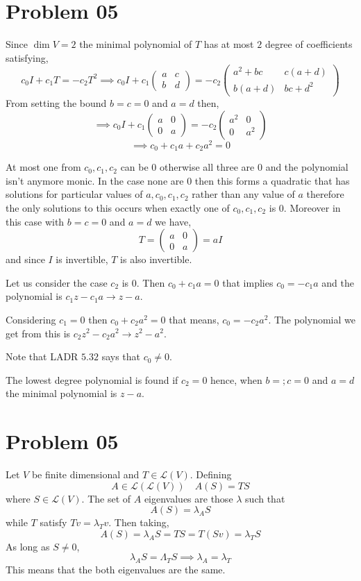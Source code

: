 \documentclass[letter]{article}
\begin{document}
	\section*{Problem 05} 
	Since $\dim V = 2$ the minimal polynomial of $T$ has at most $2$ degree of coefficients satisfying, 
	\[
	c_0 I + c_1 T = - c_2 T^2 \implies c_0 I + c_1 
	\begin{pmatrix} a & c \\ b & d \end{pmatrix}  = -c_2 
	\begin{pmatrix} a^2+ bc & c(a+d) \\ b(a+d) & bc + d^2 \end{pmatrix} 
	\] 
	From setting the bound $b=c=0$ and $a=d$ then, 
	\[
	\implies
	c_0 I + c_1 \begin{pmatrix} a & 0 \\ 0 & a \end{pmatrix} = 
	-c_2 \begin{pmatrix} a^2 & 0 \\ 0 & a^2 \end{pmatrix}  
	\]
	\[
	\implies c_0 + c_1 a + c_2 a^2 = 0
	\]

	At most one from  $c_0, c_1 ,c_2$ can be 0 otherwise all three are 0 and the polynomial isn't anymore monic. In the case none are $0$ then this forms a quadratic that has solutions for particular values of $a,c_0, c_1, c_2$ rather than any value of $a$ therefore the only solutions to this occurs when exactly one of $c_0,c_1,c_2$ is 0. Moreover in this case with $b = c = 0$ and $a = d$ we have, 
	\[
		T = \begin{pmatrix} a & 0 \\ 0 & a \end{pmatrix} = a I
	\] 
	and since $I$ is invertible, $T$ is also invertible. 

	Let us consider the case  $c_2$ is 0. Then $c_0 + c_1 a = 0$ that implies $c_0 = -c_1 a$ and the polynomial is $c_1 z - c_1 a \to  z - a$. 

	Considering $c_1 = 0$ then $c_0 + c_2 a^2 = 0$ that means, $c_0 = - c_2 a^2 $. The polynomial we get from this is $c_2 z^2 - c_2 a^2 \to z^2 - a^2$. 

	Note that LADR  $5.32$ says that $c_0 \neq 0$. 

	The lowest degree polynomial is found if $c_2 = 0$ hence, 
	when $b = ;c = 0$ and $a= d$ the minimal polynomial is $z- a$. 



\section{Problem 05} 
Let $V$ be finite dimensional and $T \in \mathcal L (V)$. Defining 
\[
A \in \mathcal L (\mathcal L (V)) \quad A(S) = TS 
\]
where $S \in \mathcal L (V)$. The set of $A$ eigenvalues are those $\lambda$ such that 
\[
A(S) = \lambda_A S
\] while $T$ satisfy $T v = \lambda_T v$. Then taking, 
\[
A(S) = \lambda_A S = TS =T (Sv) = \lambda_T S
\]
As long as $S\neq 0$, 
\[
\lambda_A S = \Lambda_T S \implies \lambda_A = \lambda_T
\]
This means that the both eigenvalues are the same. 
\end{document}
